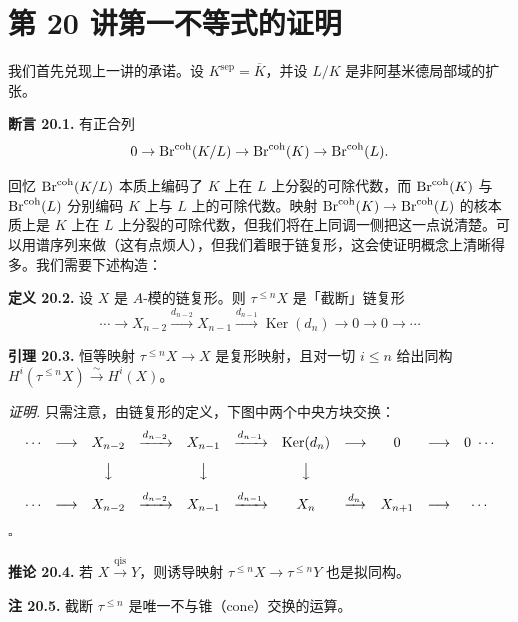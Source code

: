 \section*{第 20 讲\quad 第一不等式的证明}

我们首先兑现上一讲的承诺。设 $K^{\mathrm{sep}}=\overline K$，并设 $L/K$ 是非阿基米德局部域的扩张。

\textbf{断言 20.1.} 有正合列
\[
0\to \operatorname{Br}^{\mathrm{coh}}(K/L)\to \operatorname{Br}^{\mathrm{coh}}(K)\to \operatorname{Br}^{\mathrm{coh}}(L).
\]

回忆 $\operatorname{Br}^{\mathrm{coh}}(K/L)$ 本质上编码了 $K$ 上在 $L$ 上分裂的可除代数，而 $\operatorname{Br}^{\mathrm{coh}}(K)$ 与 $\operatorname{Br}^{\mathrm{coh}}(L)$ 分别编码 $K$ 上与 $L$ 上的可除代数。映射 $\operatorname{Br}^{\mathrm{coh}}(K)\to\operatorname{Br}^{\mathrm{coh}}(L)$ 的核本质上是 $K$ 上在 $L$ 上分裂的可除代数，但我们将在上同调一侧把这一点说清楚。可以用谱序列来做（这有点烦人），但我们着眼于链复形，这会使证明概念上清晰得多。我们需要下述构造：

\textbf{定义 20.2.} 设 $X$ 是 $A$-模的链复形。则 $\tau^{\leq n}X$ 是「截断」链复形
\[
\cdots\to X_{n-2}\xrightarrow{d_{n-2}}X_{n-1}\xrightarrow{d_{n-1}}\operatorname{Ker}(d_n)\to 0\to 0\to\cdots
\]

\textbf{引理 20.3.} 恒等映射 $\tau^{\leq n}X\to X$ 是复形映射，且对一切 $i\leq n$ 给出同构 $H^i(\tau^{\leq n}X)\xrightarrow{\sim}H^i(X)$。

\textit{证明.} 只需注意，由链复形的定义，下图中两个中央方块交换：
\[
\begin{array}{ccccccccccc}
\cdots & \longrightarrow & X_{n-2} & \xrightarrow{d_{n-2}} & X_{n-1} & \xrightarrow{d_{n-1}} & \operatorname{Ker}(d_n) & \longrightarrow & 0 & \longrightarrow & 0\ \cdots\\[8pt]
 & & \big\downarrow & & \big\downarrow & & \big\downarrow & & & & \\[8pt]
\cdots & \longrightarrow & X_{n-2} & \xrightarrow{d_{n-2}} & X_{n-1} & \xrightarrow{d_{n-1}} & X_n & \xrightarrow{d_n} & X_{n+1} & \longrightarrow & \cdots
\end{array}
\]
\hfill$\square$

\textbf{推论 20.4.} 若 $X\xrightarrow{\mathrm{qis}}Y$，则诱导映射 $\tau^{\leq n}X\to\tau^{\leq n}Y$ 也是拟同构。

\textbf{注 20.5.} 截断 $\tau^{\leq n}$ 是唯一不与锥（cone）交换的运算。


